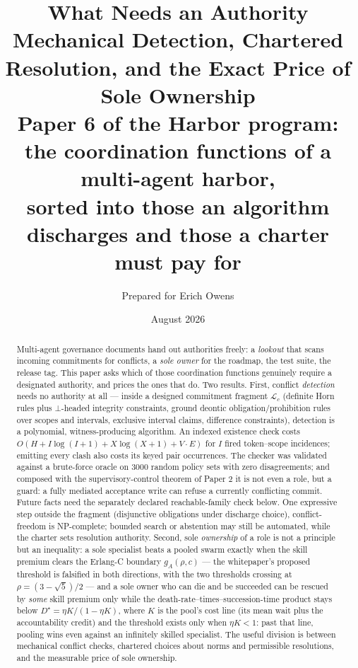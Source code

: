 \documentclass[11pt,a4paper]{article}
\title{\textbf{What Needs an Authority}\\[4pt]
\large Mechanical Detection, Chartered Resolution, and the Exact Price of Sole Ownership\\[3pt]
\normalsize Paper 6 of the Harbor program: the coordination functions of a multi-agent harbor,\\
sorted into those an algorithm discharges and those a charter must pay for}
\author{Prepared for Erich Owens}
\date{August 2026}
\begin{document}
\maketitle

\begin{abstract}
\noindent Multi-agent governance documents hand out authorities freely: a \emph{lookout} that scans incoming commitments for
conflicts, a \emph{sole owner} for the roadmap, the test suite, the release tag. This paper asks which of those coordination
functions genuinely require a designated authority, and prices the ones that do. Two results. First, conflict \emph{detection} needs
no authority at all --- inside a designed commitment fragment $\mathcal{L}_c$ (definite Horn rules plus $\bot$-headed integrity
constraints, ground deontic obligation/prohibition rules over scopes and intervals, exclusive interval claims, difference
constraints), detection is a polynomial, witness-producing algorithm. An indexed existence check costs
$O(H+I\log(I+1)+X\log(X+1)+V\!\cdot\!E)$ for $I$ fired token--scope incidences; emitting every clash also costs its keyed
pair occurrences. The checker was validated against a
brute-force oracle on 3000 random policy sets with zero disagreements; and composed with the supervisory-control theorem of Paper 2 it is not even a role, but
a guard: a fully mediated acceptance write can refuse a currently conflicting commit. Future facts need the separately declared
reachable-family check below. One expressive step outside the fragment (disjunctive obligations under discharge choice),
conflict-freedom is NP-complete; bounded search or abstention may still be automated, while the charter sets resolution authority. Second, sole \emph{ownership}
of a role is not a principle but an inequality: a sole specialist beats a pooled swarm exactly when the skill premium clears the
Erlang-C boundary $g_A(\rho,c)$ --- the whitepaper's proposed threshold is falsified in both directions, with the two thresholds
crossing at $\rho=(3-\sqrt5)/2$ --- and a sole owner who can die and be succeeded can be rescued by \emph{some} skill premium only
while the death-rate--times--succession-time product stays below $D^\star=\eta K/(1-\eta K)$, where $K$ is the pool's cost line (its
mean wait plus the accountability credit) and the threshold exists only when $\eta K<1$: past that line, pooling wins even against an
infinitely skilled specialist. The useful division is between mechanical conflict checks, chartered choices about norms and permissible resolutions,
and the measurable price of sole ownership.
\end{abstract}
\end{document}
